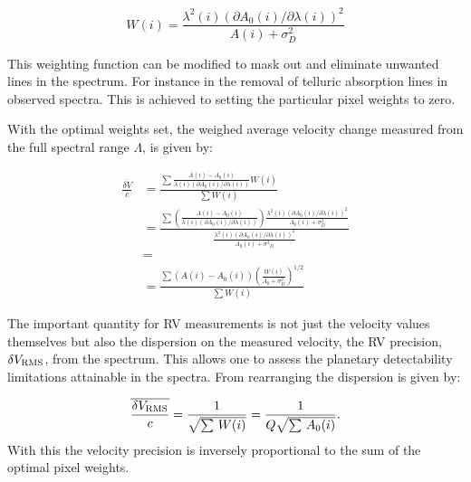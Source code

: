 \begin{equation}
W(i) = \frac{{\lambda}^{2}(i) {({\partial A_0(i)}/{\partial \lambda(i)})}^{2}}{A(i) + {\sigma}^{2}_{D}} \label{eq:optimal_weight}
\end{equation}

This weighting function can be modified to mask out and eliminate unwanted lines in the spectrum. For instance in the removal of telluric absorption lines in observed spectra. This is achieved to setting the particular pixel weights to zero.

With the optimal weights set, the weighed average velocity change measured from the full spectral range \(\Lambda\), is given by:

\begin{eqnarray}
    \frac{\overline{\delta V}}{c} &= \frac{
        \sum{
            \frac{
                A(i) - A_0(i)}{
                \lambda(i) \left({\partial A_0(i)}/{\partial \lambda(i)}\right)} W(i)}}{
             \sum{{W(i)}}} \\
    &= \frac{
        \sum {
            (\frac
                {A(i) - A_0(i)}
                {\lambda(i) (\partial A_0(i)/\partial \lambda(i))}) \frac
                    {\lambda^{2}(i) {({\partial A_0(i)}/{\partial \lambda(i)})}^{2}}
                    {A_{0}(i) + {\sigma}^{2}_{D}}
                 }
         }
    {\frac
        {\lambda^{2}(i) {({\partial A_0(i)}/{\partial \lambda(i)})}^{2}}{A_{0}(i) + {{\sigma}^{2}}_{D}}
        } \\
    &= \\
    &= \frac{\sum{(A(i) - A_0(i)){\left(\frac{W(i)}{A_0 +{\sigma}_{D}^{2}}\right)}^{1/2}}}{\sum{W(i)}}
    \label{eq:delta_v_eqarray}
\end{eqnarray}

The important quantity for {RV} measurements is not just the velocity values themselves but also the dispersion on the measured velocity, the RV precision, \(\delta V_{\textrm{RMS}}\), from the spectrum. This allows one to assess the planetary detectability limitations attainable in the spectra. From rearranging  the dispersion is given by:

\begin{equation}
    \overline{\frac{\delta V_{\textrm{RMS}}}{c}} = \frac{1}{\sqrt{\sum{\,W(i)}}} = \frac{1}{Q \sqrt{\sum{\,A_0(i)}}}. \label{eq:dv_rms}
\end{equation}
With this the velocity precision is inversely proportional to the sum of the optimal pixel weights.

